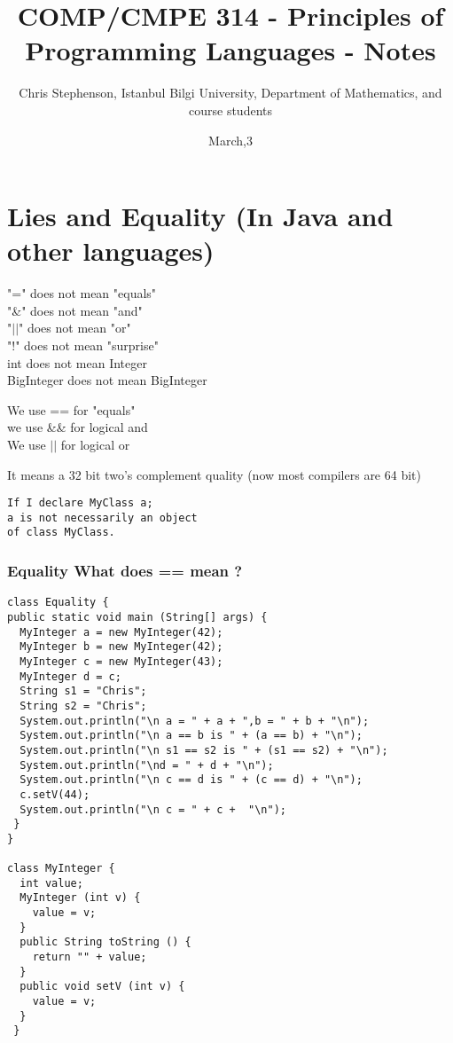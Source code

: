 \documentclass{article}
\begin{document}
\title{COMP/CMPE 314 - Principles of Programming Languages - Notes}
\author{Chris Stephenson, Istanbul Bilgi University, Department of Mathematics, and course students}
\date{March,3}
\maketitle

\section*{Lies and Equality (In Java and other languages)}
\begin{flushleft}
"=" does not mean "equals" \\
"\&" does not mean "and"\\
"$||$" does not mean "or"\\   
"!" does not mean "surprise"\\
int does not mean Integer\\
BigInteger does not mean BigInteger\\              
\end{flushleft}

\begin{flushleft}
We use == for "equals"\\
we use \&\& for logical and\\
We use $||$ for logical or\\
\end{flushleft}

\doublespacing
\begin{flushleft}
It means a 32 bit two's complement quality (now most compilers are 64 bit)
\end{flushleft}

\begin{verbatim}
If I declare MyClass a;
a is not necessarily an object
of class MyClass.
\end{verbatim}
%

\subsubsection*{Equality What does == mean ?}
    
\begin{verbatim}
class Equality {
public static void main (String[] args) {
  MyInteger a = new MyInteger(42);
  MyInteger b = new MyInteger(42);
  MyInteger c = new MyInteger(43);
  MyInteger d = c;
  String s1 = "Chris";
  String s2 = "Chris";
  System.out.println("\n a = " + a + ",b = " + b + "\n");
  System.out.println("\n a == b is " + (a == b) + "\n");
  System.out.println("\n s1 == s2 is " + (s1 == s2) + "\n");
  System.out.println("\nd = " + d + "\n");
  System.out.println("\n c == d is " + (c == d) + "\n");
  c.setV(44);
  System.out.println("\n c = " + c +  "\n");
 }
}

class MyInteger {
  int value;
  MyInteger (int v) {
    value = v;
  }
  public String toString () {
    return "" + value;
  }
  public void setV (int v) {
    value = v;
  }
 }
\end{verbatim}    
\end{document}
